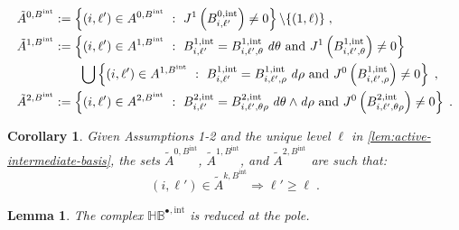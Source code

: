 \documentclass[10pt,a4paper]{amsart}
\newtheorem{lemma}{Lemma}
\newtheorem{corollary}{Corollary}
\newcommand{\activeS}[2]{A^{#1}_{#2}}
\newcommand{\bsp}{B}
\newcommand{\cU}{\theta}
\newcommand{\cV}{\rho}
\newcommand{\complex}[1]{\mathit{\vSpace{#1}^\bullet}}
\newcommand{\dcU}{\mathit{d\cU}}
\newcommand{\dcV}{\mathit{d\cV}}
\newcommand{\hintComplex}{\complex{H\bsp}^{,\tint}}
\newcommand{\jet}[2]{J^{#1}\left(#2\right)}
\newcommand{\ractiveS}[2]{\tilde{A}^{#1}_{#2}}
\newcommand{\tint}{\mathrm{int}}
\newcommand{\vSpace}[1]{\mathbb{#1}}
\begin{document}
\begin{equation}\label{eq:reduced-active-sets}
    \small
    \begin{split}
        \ractiveS{0,\bsp^\tint}{} &:= \left\{
            (i,\ell') \in \activeS{0,\bsp^\tint}{} ~:~ \jet{1}{\bsp^{0,\tint}_{i,\ell'}} \neq 0
        \right\}\backslash \{ (1,\ell) \}\;,\\
        \ractiveS{1,\bsp^\tint}{} &:= \left\{
            (i,\ell') \in \activeS{1,\bsp^\tint}{} ~:~
            \bsp^{1,\tint}_{i,\ell'} = \bsp^{1,\tint}_{i,\ell',\cU}\;\dcU
            \text{ and }
            \jet{1}{\bsp^{1,\tint}_{i,\ell',\cU}} \neq 0
        \right\} \\
        &\qquad\bigcup
        \left\{
            (i,\ell') \in \activeS{1,\bsp^\tint}{} ~:~
            \bsp^{1,\tint}_{i,\ell'} = \bsp^{1,\tint}_{i,\ell',\cV}\;\dcV
            \text{ and }
            \jet{0}{\bsp^{1,\tint}_{i,\ell',\cV}} \neq 0
        \right\}\;,\\
        \ractiveS{2,\bsp^\tint}{} &:= \left\{
            (i,\ell') \in \activeS{2,\bsp^\tint}{} ~:~
            \bsp^{2,\tint}_{i,\ell'} = \bsp^{2,\tint}_{i,\ell',\cU\cV}\;\dcU\wedge\dcV
            \text{ and }
            \jet{0}{\bsp^{2,\tint}_{i,\ell',\cU\cV}} \neq 0
        \right\}\;.
    \end{split}
\end{equation}

\begin{corollary}\label{cor:reduced-intermediate-basis}
    Given Assumptions 1-2 and the unique level $\ell$ in \cref{lem:active-intermediate-basis}, the sets $\ractiveS{0,\bsp^\tint}{}$, $\ractiveS{1,\bsp^\tint}{}$, and $\ractiveS{2,\bsp^\tint}{}$ are such that:
    \begin{equation*}
        (i, \ell') \in \ractiveS{k,\bsp^\tint}{} \Longrightarrow \ell' \geq \ell\;.
    \end{equation*}
\end{corollary}

\begin{lemma}\label{lem:intermediate-reduced-complex}
    The complex $\hintComplex$ is reduced at the pole.
\end{lemma}
\end{document}
